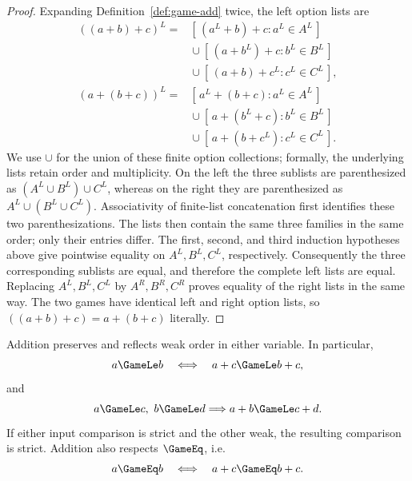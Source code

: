 \begin{proof}
  Expanding Definition~\ref{def:game-add} twice, the left option lists are
  \[
    \begin{aligned}
      ((a+b)+c)^L
       ={}&[\,(a^L+b)+c:a^L\in A^L\,]\\
          &{}\cup[\,(a+b^L)+c:b^L\in B^L\,]\\
          &{}\cup[\,(a+b)+c^L:c^L\in C^L\,],\\[2mm]
      (a+(b+c))^L
       ={}&[\,a^L+(b+c):a^L\in A^L\,]\\
          &{}\cup[\,a+(b^L+c):b^L\in B^L\,]\\
          &{}\cup[\,a+(b+c^L):c^L\in C^L\,].
    \end{aligned}
  \]
  We use \(\cup\) for the union of these finite option collections; formally, the underlying
  lists retain order and multiplicity.  On the left the three sublists are parenthesized as
  \((A^L\cup B^L)\cup C^L\), whereas on the right they are parenthesized as
  \(A^L\cup(B^L\cup C^L)\).  Associativity of finite-list concatenation first identifies these
  two parenthesizations.
  The lists then contain the same three families in the same order; only their
  entries differ.  The first, second, and third induction
  hypotheses above give pointwise equality on \(A^L,B^L,C^L\), respectively.
  Consequently the three corresponding sublists are equal, and therefore the
  complete left lists are equal.  Replacing \(A^L,B^L,C^L\) by
  \(A^R,B^R,C^R\) proves equality of the right lists in the same way.  The two
  games have identical left and right option lists, so
  \(((a+b)+c)=a+(b+c)\) literally.
\end{proof}
\begin{theorem}
  \label{thm:game-add-order}
  \leanok
  Addition preserves and reflects weak order in either variable.  In particular,
  \[
    a\GameLe b\quad\Longleftrightarrow\quad a+c\GameLe b+c,
  \]
  and
  \[
    a\GameLe c,\ b\GameLe d\Longrightarrow a+b\GameLe c+d.
  \]
  If either input comparison is strict and the other weak, the resulting comparison is strict.
  Addition also respects \(\GameEq\), i.e.
  \[
    a\GameEq b\quad\Longleftrightarrow\quad a+c\GameEq b+c.
  \]
\end{theorem}
